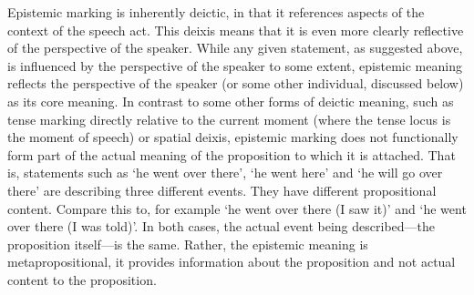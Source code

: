 Epistemic marking is inherently deictic, in that it references aspects of the context of the speech act. This deixis means that it is even more clearly reflective of the perspective of the speaker. While any given statement, as suggested above, is influenced by the perspective of the speaker to some extent, epistemic meaning reflects the perspective of the speaker (or some other individual, discussed below) as its core meaning. In contrast to some other forms of deictic meaning, such as tense marking directly relative to the current moment (where the tense locus is the moment of speech) or spatial deixis, epistemic marking does not functionally form part of the actual meaning of the proposition to which it is attached. That is, statements such as `he went over there', `he went here' and `he will go over there' are describing three different events. They have different propositional content. Compare this to, for example `he went over there (I saw it)' and `he went over there (I was told)'. In both cases, the actual event being described---the proposition itself---is the same. Rather, the epistemic meaning is metapropositional, it provides information about the proposition and not actual content to the proposition.

